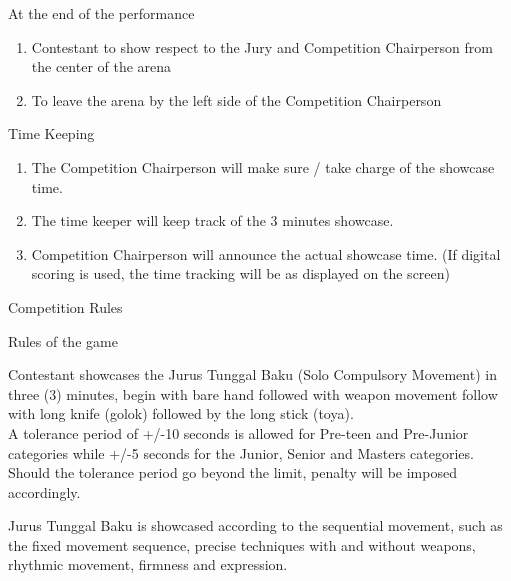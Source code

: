 \begin{legal}
\begin{legal}
    \item At the end of the performance
        \begin{enumerate}[label=\alph*.]
        \item Contestant to show respect to the Jury and Competition Chairperson from the center of the arena
        \item To leave the arena by the left side of the Competition Chairperson
        \end{enumerate}

    \item Time Keeping
        \begin{enumerate}[label=\alph*.]
        \item The Competition Chairperson will make sure / take charge of the showcase time.
        \item The time keeper will keep track of the 3 minutes showcase.
        \item Competition Chairperson will announce the actual showcase time. (If digital scoring is used, 
            the time tracking will be as displayed on the screen)
        \end{enumerate}

    \end{legal}

\item Competition Rules

    \begin{legal}
    \item Rules of the game

        \begin{legal}
        \item Contestant showcases the Jurus Tunggal Baku (Solo Compulsory Movement) in three (3) minutes, 
            begin with bare hand followed with weapon movement follow with long knife (golok) followed by the 
            long stick (toya). \\

            A tolerance period of +/-10 seconds is allowed for Pre-teen and Pre-Junior categories while +/-5 
            seconds for the Junior, Senior and Masters categories.\\

            Should the tolerance period go beyond the limit, penalty will be imposed accordingly.
        
        \item Jurus Tunggal Baku is showcased according to the sequential movement, 
            such as the fixed movement sequence, precise techniques with and without weapons, rhythmic movement, 
            firmness and expression.


\end{legal}
\end{legal}
\end{legal}
